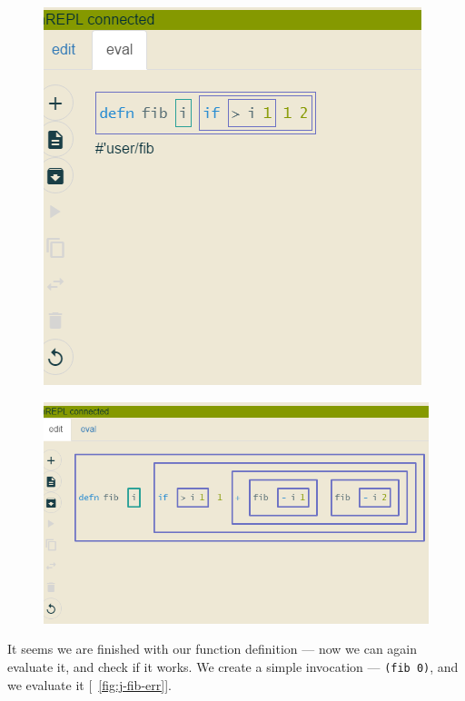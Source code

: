 \documentclass[english,mgr,shortabstract]{iithesis}
\newcommand*{\figref}[1]{[\textbf{\figurename}~\ref{#1}]}
\begin{document}
\begin{figure}[hbt]
  \centering
  \begin{minipage}{0.48\textwidth}
    \centering
    \includegraphics[scale=0.3]{img/j-if-check}
\label{fig:j-if-check}
  \end{minipage}
  \begin{minipage}{0.48\textwidth}
    \centering
    \includegraphics[scale=0.3]{img/j-fib-rec}
\label{fig:j-fib-rec}
  \end{minipage}
\end{figure}

It seems we are finished with our function definition --- now we can again
evaluate it, and check if it
works. We create a simple invocation --- \lstinline{(fib 0)}, and we evaluate it
\figref{fig:j-fib-err}.
\end{document}
